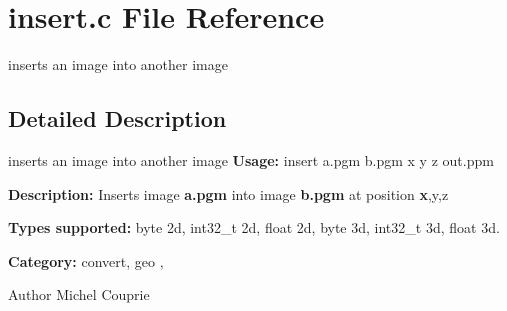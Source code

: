 \section{insert.c File Reference}
\label{insert_8c}


inserts an image into another image  




\subsection{Detailed Description}
inserts an image into another image {\bfseries Usage:} insert a.pgm b.pgm x y z out.ppm

{\bfseries Description:} Inserts image {\bfseries a.pgm} into image {\bfseries b.pgm} at position {\bfseries x},y,z

{\bfseries Types supported:} byte 2d, int32\_\-t 2d, float 2d, byte 3d, int32\_\-t 3d, float 3d.

{\bfseries Category:} convert, geo ,

\begin{DoxyAuthor}{Author}
Michel Couprie 
\end{DoxyAuthor}
